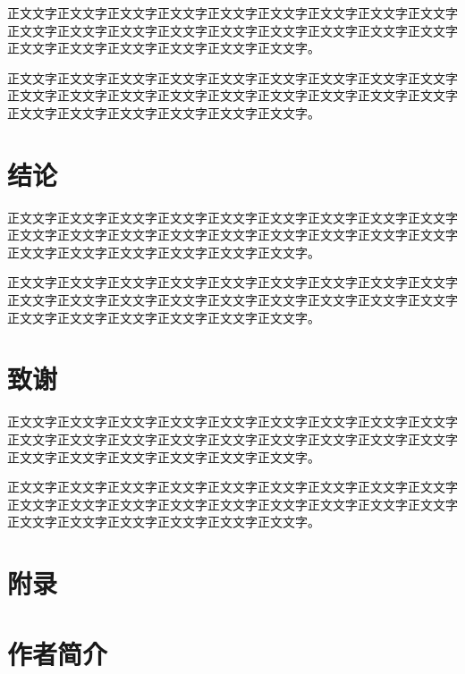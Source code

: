 \documentclass[
	StudentName     = 孙敬垚,
	StudentNameEng	= {{Name of Graduate (such as HAN Bao-cheng)}},
	AdvisorName     = {{冯兴杰 教授}},
	AdvisorNameEng	= {{Name of Supervisor and Title (such as Prof. FENG Chang-gen)}},
        AdvisorNameEngSecond = {{Name of Second Supervisor and Title}},
	StudentID		= XXXXX,
	Major           = ,
	ResearchInterest= ,
	Department		= XXXX学院,
	DepartmentEng	= {{Name of Department (or School)}},
	SubmitYear		= 202X,
	SubmitMonth		= X,
	SubmitDay		= XX,
	DefenseYear		= 202X,
	DefenseMonth	= X,
	DefenseDay		= XX,
	DefenseDateEng	= {{Date of Submit (such as April 2002)}},
	Title           = I2TDM,
	TitleEng        = {{English Title}},
	CLCNumber		= TD235,
	UDCNumber		= 624.152.5
]{cauc_thesis}
\begin{document}
正文文字正文文字正文文字正文文字正文文字正文文字正文文字正文文字正文文字正文文字正文文字正文文字正文文字正文文字正文文字正文文字正文文字正文文字正文文字正文文字正文文字正文文字正文文字正文文字。

正文文字正文文字正文文字正文文字正文文字正文文字正文文字正文文字正文文字正文文字正文文字正文文字正文文字正文文字正文文字正文文字正文文字正文文字正文文字正文文字正文文字正文文字正文文字正文文字。

{\centering \chapter *{结\quad\quad 论}}
正文文字正文文字正文文字正文文字正文文字正文文字正文文字正文文字正文文字正文文字正文文字正文文字正文文字正文文字正文文字正文文字正文文字正文文字正文文字正文文字正文文字正文文字正文文字正文文字。

正文文字正文文字正文文字正文文字正文文字正文文字正文文字正文文字正文文字正文文字正文文字正文文字正文文字正文文字正文文字正文文字正文文字正文文字正文文字正文文字正文文字正文文字正文文字正文文字。

{\centering \chapter *{致\qquad 谢}}

正文文字正文文字正文文字正文文字正文文字正文文字正文文字正文文字正文文字正文文字正文文字正文文字正文文字正文文字正文文字正文文字正文文字正文文字正文文字正文文字正文文字正文文字正文文字正文文字。

正文文字正文文字正文文字正文文字正文文字正文文字正文文字正文文字正文文字正文文字正文文字正文文字正文文字正文文字正文文字正文文字正文文字正文文字正文文字正文文字正文文字正文文字正文文字正文文字。


\nocite{*}%
{\centering }

{\centering \chapter *{附\qquad 录}}


{\centering \chapter*{作者简介}}
\end{document}
